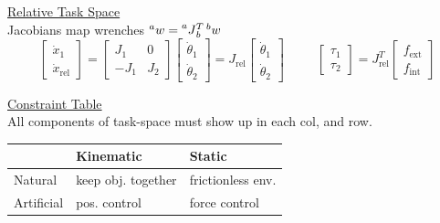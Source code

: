 \documentclass[twocolumn]{article}    %
\begin{document}
\noindent\underline{Relative Task Space}\\
Jacobians map wrenches \(\prescript{a}{}{w} = \prescript{a}{}{J}^T_b \prescript{b}{}{w}\)
\begin{equation*}
    \begin{bmatrix}
        \dot{x}_1 \\ \dot{x}_{\text{rel}}
    \end{bmatrix} = \begin{bmatrix}
        J_1 & 0 \\ -J_1 & J_2
    \end{bmatrix}\begin{bmatrix}
        \dot{\theta}_1 \\\dot{\theta}_2 
    \end{bmatrix} = J_{\text{rel}} \begin{bmatrix}
        \dot{\theta}_1 \\\dot{\theta}_2 
    \end{bmatrix}  \hspace{30pt} \begin{bmatrix}
        \tau_1 \\\tau_2
    \end{bmatrix} = J^T_{\text{rel}} \begin{bmatrix}
        f_{\text{ext}} \\ f_{\text{int}}
    \end{bmatrix}
\end{equation*}


\noindent\underline{Constraint Table}\\
All components of task-space must show up in each col, and row. 
\begin{table}[h!]
    \footnotesize
    \centering
    \begin{tabular}{l|l|l}
         & Kinematic & Static \\
         \hline
        Natural & keep obj. together & frictionless env. \\
        \hline
        Artificial & pos. control & force control 
    \end{tabular}
\end{table}
\end{document}
